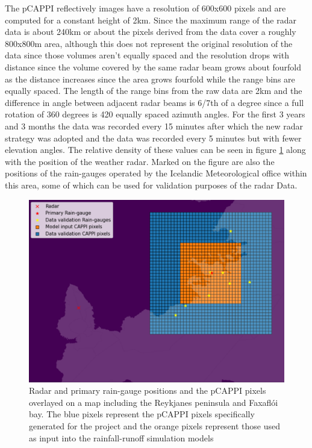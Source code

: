 The pCAPPI reflectively images have a resolution of 600x600 pixels and are computed for a constant height of 2km. Since the maximum range of the radar data is about 240km or about the pixels derived from the data cover a roughly 800x800m area, although this does not represent the original resolution of the data since those volumes aren't equally spaced and the resolution drops with distance since the volume covered by the same radar beam grows about fourfold as the distance increases since the area grows fourfold while the range bins are equally spaced. The length of the range bins from the raw data are 2km and the difference in angle between adjacent radar beams is 6/7th of a degree since a full rotation of 360 degrees is 420 equally spaced azimuth angles. For the first 3 years and 3 months the data was recorded every 15 minutes after which the new radar strategy was adopted and the data was recorded every 5 minutes but with fewer elevation angles. The relative density of these values can be seen in figure \ref{fig:CappiResolution} along with the position of the weather radar. Marked on the figure are also the positions of the rain-gauges operated by the Icelandic Meteorological office within this area, some of which can be used for validation purposes of the radar Data.  

\begin{figure}[H]
\centering\includegraphics[width=\textwidth]{Pictures/Diagrams/CappiDataValidation.png}
\caption{Radar and primary rain-gauge positions and the pCAPPI pixels overlayed on a map including the Reykjanes peninsula and Faxaflói bay. The blue pixels represent the pCAPPI pixels specifically generated for the project and the orange pixels represent those used as input into the rainfall-runoff simulation models}
\label{fig:CappiResolution}
\end{figure}

